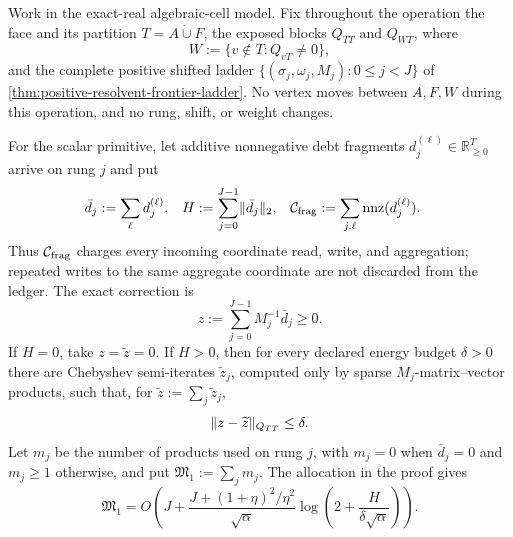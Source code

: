 \begin{theorem}
\label{thm:aggregate-chebyshev-debt-flush}
Work in the exact-real algebraic-cell model.  Fix throughout the operation the
face and its partition $T=A\mathbin{\dot\cup}F$, the exposed blocks
$Q_{TT}$ and $Q_{WT}$, where
\begin{equation*}
 W:=\{v\notin T:Q_{vT}\neq0\},
\end{equation*}
and the complete positive shifted ladder
$\{(\sigma_j,\omega_j,M_j):0\leq j<J\}$ of
\cref{thm:positive-resolvent-frontier-ladder}.  No vertex moves between
$A,F,W$ during this operation, and no rung, shift, or weight changes.

For the scalar primitive, let additive nonnegative debt fragments
$d_j^{(\ell)}\in\mathbb R_{\geq0}^T$ arrive on rung $j$ and put
\begin{align}
 \bar d_j&:=\sum_\ell d_j^{(\ell)},
 &H&:=\sum_{j=0}^{J-1}\lVert\bar d_j\rVert_2,
 &\mathcal C_{\rm frag}
 &:=\sum_{j,\ell}\operatorname{nnz}(d_j^{(\ell)}).
 \label{eq:aggregate-debt-scalar-data}
\end{align}
Thus $\mathcal C_{\rm frag}$ charges every incoming coordinate read, write,
and aggregation; repeated writes to the same aggregate coordinate are not
discarded from the ledger.  The exact correction is
\begin{equation}
 z:=\sum_{j=0}^{J-1}M_j^{-1}\bar d_j\geq0.
 \label{eq:aggregate-debt-exact-correction}
\end{equation}
If $H=0$, take $z=\widetilde z=0$.  If $H>0$, then for every declared
energy budget $\delta>0$ there are Chebyshev semi-iterates
$\widetilde z_j$, computed only by sparse $M_j$-matrix--vector products,
such that, for $\widetilde z:=\sum_j\widetilde z_j$,
\begin{equation}
 \lVert z-\widetilde z\rVert_{Q_{TT}}\leq\delta.
 \label{eq:aggregate-debt-energy-certificate}
\end{equation}
Let $m_j$ be the number of products used on rung $j$, with $m_j=0$ when
$\bar d_j=0$ and $m_j\geq1$ otherwise, and put
$\mathfrak M_1:=\sum_jm_j$.  The allocation in the
proof gives
\begin{equation}
 \mathfrak M_1
 =O\!\left(
  J+
  \frac{J+(1+\eta)^2/\eta^2}{\sqrt\alpha}
  \log\!\left(2+\frac{H}{\delta\sqrt\alpha}\right)
 \right).
 \label{eq:aggregate-debt-chebyshev-products}
\end{equation}


\end{theorem}
